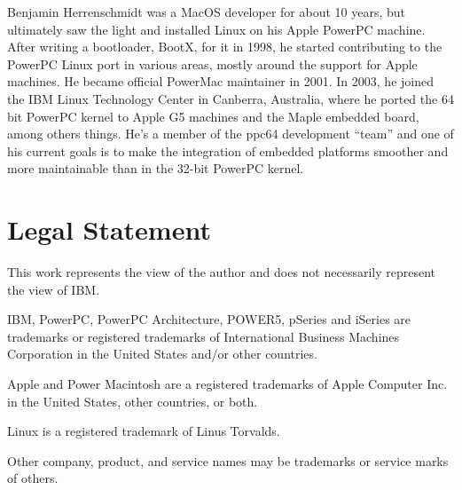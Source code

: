 \documentclass[a4paper,twocolumn]{article}
\newcommand{\ppc}{\mbox{PowerPC}\xspace}
\begin{document}
Benjamin Herrenschmidt was a MacOS developer for about 10 years, but
ultimately saw the light and installed Linux on his Apple PowerPC
machine.  After writing a bootloader, BootX, for it in 1998, he
started contributing to the PowerPC Linux port in various areas,
mostly around the support for Apple machines. He became official
PowerMac maintainer in 2001. In 2003, he joined the IBM Linux
Technology Center in Canberra, Australia, where he ported the 64 bit
PowerPC kernel to Apple G5 machines and the Maple embedded board,
among others things.  He's a member of the ppc64 development ``team''
and one of his current goals is to make the integration of embedded
platforms smoother and more maintainable than in the 32-bit PowerPC
kernel.

\section*{Legal Statement}

This work represents the view of the author and does not necessarily
represent the view of IBM.

IBM, \ppc, \ppc Architecture, POWER5, pSeries and iSeries are
trademarks or registered trademarks of International Business Machines
Corporation in the United States and/or other countries.

Apple and Power Macintosh are a registered trademarks of Apple
Computer Inc. in the United States, other countries, or both.

Linux is a registered trademark of Linus Torvalds.

Other company, product, and service names may be trademarks or service
marks of others.
\end{document}
